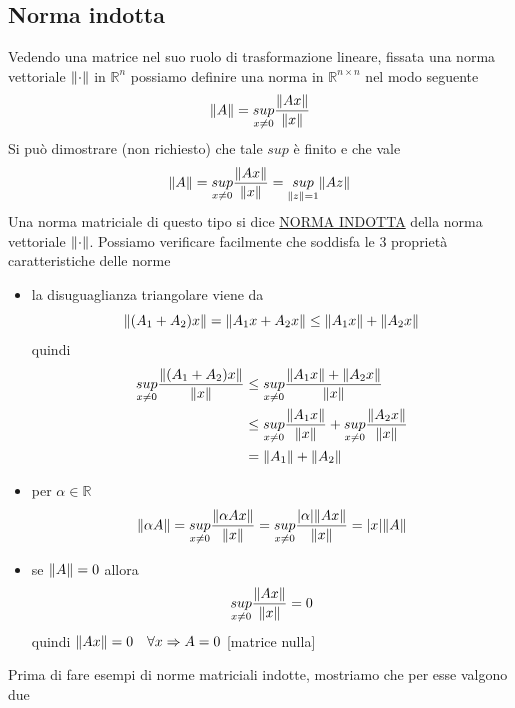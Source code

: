 \documentclass[12pt,a4paper]{article}
\DeclarePairedDelimiter{\abs}{\lvert}{\rvert}
\DeclarePairedDelimiter{\norma}{\lVert}{\rVert}
\begin{document}
\subsection{Norma indotta}
Vedendo una matrice nel suo ruolo di trasformazione lineare, fissata una norma vettoriale $\norma{\cdot}$
in $\mathbb{R}^n$ possiamo definire una norma in $\mathbb{R}^{n\times n}$ nel modo seguente 
\begin{equation*}
    \norma{A}=\underset{x\neq0}{sup}\frac{\norma{Ax}}{\norma{x}}
\end{equation*}
Si può dimostrare (non richiesto) che tale $sup$ è finito e che vale
\begin{equation*}
    \norma{A}=\underset{x\neq0}{sup}\frac{\norma{Ax}}{\norma{x}}=\underset{\norma{z}=1}{sup}\norma{Az}
\end{equation*}
Una norma matriciale di questo tipo si dice \uline{NORMA INDOTTA} della norma vettoriale $\norma{\cdot}$.
Possiamo verificare facilmente che soddisfa le 3 proprietà
caratteristiche delle norme
\begin{itemize}
    \item la disuguaglianza triangolare viene da
    \[
    \norma{(A_1 + A_2)x} = \norma{A_1x + A_2x} \le \norma{A_1x} + \norma{A_2x}
    \]
    quindi
\begin{align*}
        \underset{x \neq 0}{sup} \frac{\norma{(A_1 + A_2)x}}{\norma{x}} & \le \underset{x \neq 0}{sup} \frac{\norma{A_1x} + \norma{A_2x}}{\norma{x}} \\
        & \le \underset{x \neq 0}{sup} \frac{\norma{A_1x}}{\norma{x}} + \underset{x \neq 0}{sup} \frac{\norma{A_2x}}{\norma{x}} \\
        & = \norma{A_1} + \norma{A_2}
    \end{align*}
    
    \item per $\alpha \in \mathbb{R}$
    \[
    \norma{\alpha A} = \underset{x \neq 0}{sup} \frac{\norma{\alpha Ax}}{\norma{x}}
    = \underset{x \neq 0}{sup} \frac{\abs{\alpha} \norma{Ax}}{\norma{x}} = \abs{x} \norma{A}
    \]
    
    \item se $\norma{A} = 0$ allora \[\underset{x \neq 0}{sup} \frac{\norma{Ax}}{\norma{x}} = 0\]
    quindi $\norma{Ax} = 0 \quad \forall x \Rightarrow A = 0$ [matrice nulla]
\end{itemize}
Prima di fare esempi di norme matriciali indotte, mostriamo che per esse valgono due
\end{document}
